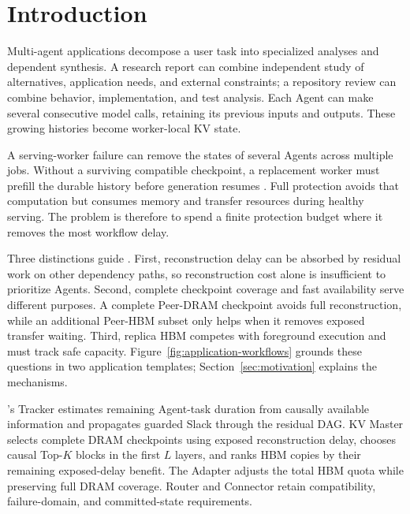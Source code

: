 \section{Introduction}\label{sec:introduction}

Multi-agent applications decompose a user task into specialized analyses
and dependent synthesis. A research report can combine independent study
of alternatives, application needs, and external constraints; a repository
review can combine behavior, implementation, and test analysis. Each Agent
can make several consecutive model calls, retaining its previous inputs and
outputs. These growing histories become worker-local KV state.

A serving-worker failure can remove the states of several Agents across
multiple jobs. Without a surviving compatible checkpoint, a replacement
worker must prefill the durable history before generation resumes
\cite{strati2024dejavu,cao2026lumen}. Full protection avoids that computation
but consumes memory and transfer resources during healthy serving. The
problem is therefore to spend a finite protection budget where it removes
the most workflow delay.

Three distinctions guide \system. First, reconstruction delay can be
absorbed by residual work on other dependency paths, so reconstruction cost
alone is insufficient to prioritize Agents. Second, complete checkpoint
coverage and fast availability serve different purposes. A complete
Peer-DRAM checkpoint avoids full reconstruction, while an additional
Peer-HBM subset only helps when it removes exposed transfer waiting.
Third, replica HBM competes with foreground execution and must track safe
capacity. Figure~\ref{fig:application-workflows} grounds these questions
in two application templates; Section~\ref{sec:motivation} explains the
mechanisms.

\system's Tracker estimates remaining Agent-task duration from causally
available information and propagates guarded Slack through the residual
DAG. KV Master selects complete DRAM checkpoints using exposed
reconstruction delay, chooses causal Top-$K$ blocks in the first $L$
layers, and ranks HBM copies by their remaining exposed-delay benefit.
The Adapter adjusts the total HBM quota while preserving full DRAM
coverage. Router and Connector retain compatibility, failure-domain,
and committed-state requirements.

